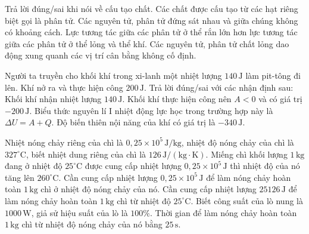 \begin{ex}
Trả lời đúng/sai khi nói về cấu tạo chất.
\choiceTF
{\True Các chất được cấu tạo từ các hạt riêng biệt gọi là phân tử.}
{Các nguyên tử, phân tử đứng sát nhau và giữa chúng không có khoảng cách.}
{\True Lực tương tác giữa các phân tử ở thể rắn lớn hơn lực tương tác giữa các phân tử ở thể lỏng và thể khí.}
{\True Các nguyên tử, phân tử chất lỏng dao động xung quanh các vị trí cân bằng không cố định.}
\end{ex}


\begin{ex}
Người ta truyền cho khối khí trong xi-lanh một nhiệt lượng $140\,\mathrm{J}$ làm pit-tông đi lên. Khí nở ra và thực hiện công $200\,\mathrm{J}$. Trả lời đúng/sai với các nhận định sau:
\choiceTF
{\True Khối khí nhận nhiệt lượng $140\,\mathrm{J}$.}
{\True Khối khí thực hiện công nên $A<0$ và có giá trị $-200\,\mathrm{J}$.}
{\True Biểu thức nguyên lí I nhiệt động lực học trong trường hợp này là $\Delta U=A+Q$.}
{Độ biến thiên nội năng của khí có giá trị là $-340\,\mathrm{J}$.}
\end{ex}

\begin{ex}
Nhiệt nóng chảy riêng của chì là $0{,}25\times10^5\,\mathrm{J/kg}$, nhiệt độ nóng chảy của chì là $327^\circ\mathrm{C}$, biết nhiệt dung riêng của chì là $126\,\mathrm{J/(kg\cdot K)}$.
\choiceTF
{Miếng chì khối lượng $1\,\mathrm{kg}$ đang ở nhiệt độ $25^\circ\mathrm{C}$ được cung cấp nhiệt lượng $0{,}25\times10^5\,\mathrm{J}$ thì nhiệt độ của nó tăng lên $260^\circ\mathrm{C}$.}
{\True Cần cung cấp nhiệt lượng $0{,}25\times10^5\,\mathrm{J}$ để làm nóng chảy hoàn toàn $1\,\mathrm{kg}$ chì ở nhiệt độ nóng chảy của nó.}
{Cần cung cấp nhiệt lượng $25126\,\mathrm{J}$ để làm nóng chảy hoàn toàn $1\,\mathrm{kg}$ chì từ nhiệt độ $25^\circ\mathrm{C}$.}
{\True Biết công suất của lò nung là $1000\,\mathrm{W}$, giả sử hiệu suất của lò là $100\%$. Thời gian để làm nóng chảy hoàn toàn $1\,\mathrm{kg}$ chì từ nhiệt độ nóng chảy của nó bằng $25\,\mathrm{s}$.}
\end{ex}

